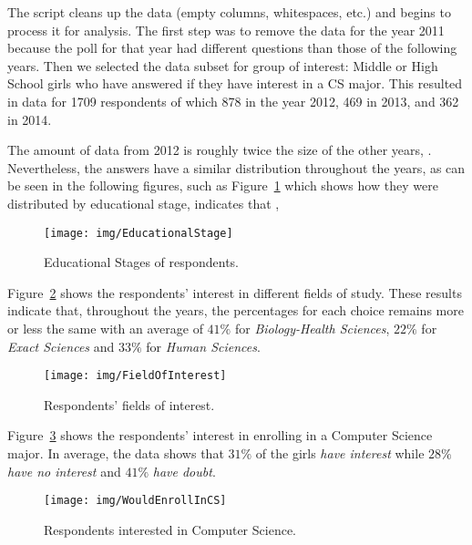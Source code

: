 The script cleans up the data (empty columns, whitespaces, etc.) and begins to process it for analysis. The first step was to remove the data for the year 2011 because the poll for that year had different questions than those of the following years. Then we selected the data subset for group of interest: Middle or High School girls who have answered if they have interest in a CS major. This resulted in data for 1709 respondents of which 878 in the year 2012, 469 in 2013, and 362 in 2014.

The amount of data from 2012 is roughly twice the size of the other years, . Nevertheless, the answers have a similar distribution throughout the years, as can be seen in the following figures, such as Figure~\ref{fig:EducationalStage} which shows how they were distributed by educational stage, indicates that ,

\begin{figure}[h!]%
\texttt{[image: img/EducationalStage]}%
\caption{Educational Stages of respondents.}%
\label{fig:EducationalStage}%
\end{figure}%

Figure~\ref{fig:FieldOfInterest} shows the respondents' interest in different fields of study. These results indicate that, throughout the years, the percentages for each choice remains more or less the same with an average of $41\%$ for \emph{Biology-Health Sciences}, $22\%$ for \emph{Exact Sciences} and $33\%$ for \emph{Human Sciences}.

\begin{figure}[h!]%
\texttt{[image: img/FieldOfInterest]}%
\caption{Respondents' fields of interest.}%
\label{fig:FieldOfInterest}%
\end{figure}%

Figure~\ref{fig:WouldEnrollInCS} shows the respondents' interest in enrolling in a Computer Science major. In average, the data shows that $31\%$ of the girls \emph{have interest} while $28\%$ \emph{have no interest} and $41\%$ \emph{have doubt}.

\begin{figure}[h!]%
\texttt{[image: img/WouldEnrollInCS]}%
\caption{Respondents interested in Computer Science.}%
\label{fig:WouldEnrollInCS}%
\end{figure}%